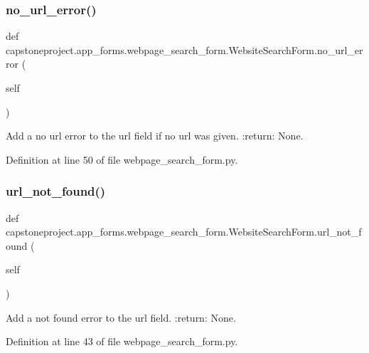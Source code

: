 \subsubsection{\texorpdfstring{no\+\_\+url\+\_\+error()}{no\_url\_error()}}
{\footnotesize\ttfamily def capstoneproject.\+app\+\_\+forms.\+webpage\+\_\+search\+\_\+form.\+Website\+Search\+Form.\+no\+\_\+url\+\_\+error (\begin{DoxyParamCaption}\item[{}]{self }\end{DoxyParamCaption})}

\begin{DoxyVerb}Add a no url error to the url field if no url was given.
:return: None.
\end{DoxyVerb}
 

Definition at line 50 of file webpage\+\_\+search\+\_\+form.\+py.

\mbox{\label{classcapstoneproject_1_1app__forms_1_1webpage__search__form_1_1_website_search_form_a249f5337370608e6e4c69f5ded772c5d}} 
\subsubsection{\texorpdfstring{url\+\_\+not\+\_\+found()}{url\_not\_found()}}
{\footnotesize\ttfamily def capstoneproject.\+app\+\_\+forms.\+webpage\+\_\+search\+\_\+form.\+Website\+Search\+Form.\+url\+\_\+not\+\_\+found (\begin{DoxyParamCaption}\item[{}]{self }\end{DoxyParamCaption})}

\begin{DoxyVerb}Add a not found error to the url field.
:return: None.
\end{DoxyVerb}
 

Definition at line 43 of file webpage\+\_\+search\+\_\+form.\+py.



